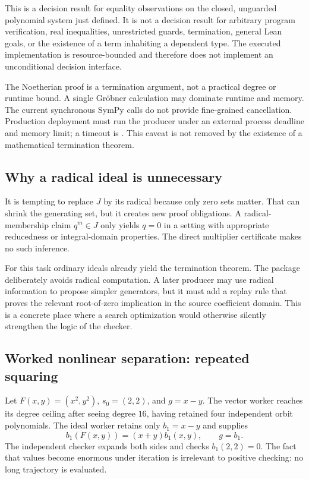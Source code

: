 \begin{remark}
This is a decision result for equality observations on the closed, unguarded polynomial system just defined. It is not a decision result for arbitrary program verification, real inequalities, unrestricted guards, termination, general Lean goals, or the existence of a term inhabiting a dependent type. The executed implementation is resource-bounded and therefore does not implement an unconditional decision interface.
\end{remark}

The Noetherian proof is a termination argument, not a practical degree or runtime bound. A single Gr\"obner calculation may dominate runtime and memory. The current synchronous SymPy calls do not provide fine-grained cancellation. Production deployment must run the producer under an external process deadline and memory limit; a timeout is \unknown{}. This caveat is not removed by the existence of a mathematical termination theorem.

\subsection{Why a radical ideal is unnecessary}

It is tempting to replace $J$ by its radical because only zero sets matter. That can shrink the generating set, but it creates new proof obligations. A radical-membership claim $q^m\in J$ only yields $q=0$ in a setting with appropriate reducedness or integral-domain properties. The direct multiplier certificate makes no such inference.

For this task ordinary ideals already yield the termination theorem. The package deliberately avoids radical computation. A later producer may use radical information to propose simpler generators, but it must add a replay rule that proves the relevant root-of-zero implication in the source coefficient domain. This is a concrete place where a search optimization would otherwise silently strengthen the logic of the checker.

\subsection{Worked nonlinear separation: repeated squaring}

Let $F(x,y)=(x^2,y^2)$, $s_0=(2,2)$, and $g=x-y$. The vector worker reaches its degree ceiling after seeing degree $16$, having retained four independent orbit polynomials. The ideal worker retains only $b_1=x-y$ and supplies
\[
 b_1(F(x,y))=(x+y)b_1(x,y),\qquad g=b_1.
\]
The independent checker expands both sides and checks $b_1(2,2)=0$. The fact that values become enormous under iteration is irrelevant to positive checking: no long trajectory is evaluated.

